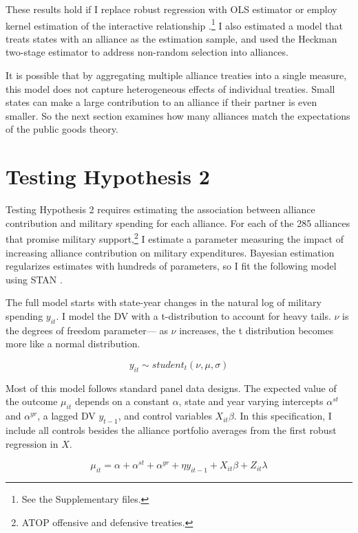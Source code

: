 \documentclass[12pt]{article}
\begin{document}
These results hold if I replace robust regression with OLS estimator or employ kernel estimation of the interactive relationship \citep{Hainmuelleretal2017}.\footnote{See the Supplementary files.} 
I also estimated a model that treats states with an alliance as the estimation sample, and used the Heckman two-stage estimator to address non-random selection into alliances. 


It is possible that by aggregating multiple alliance treaties into a single measure, this model does not capture heterogeneous effects of individual treaties.
Small states can make a large contribution to an alliance if their partner is even smaller. 
So the next section examines how many alliances match the expectations of the public goods theory. 


\section{Testing Hypothesis 2}


Testing Hypothesis 2 requires estimating the association between alliance contribution and military spending for each alliance.
For each of the 285 alliances that promise military support,\footnote{ATOP offensive and defensive treaties.} I estimate a parameter measuring the impact of increasing alliance contribution on military expenditures. 
Bayesian estimation regularizes estimates with hundreds of parameters, so I fit the following model using STAN \citep{Carpenteretal2016}.

The full model starts with state-year changes in the natural log of military spending $y_{it}$.
I model the DV with a t-distribution to account for heavy tails.
$\nu$ is the degrees of freedom parameter--- as $\nu$ increases, the t distribution becomes more like a normal distribution. 


\begin{equation}
y_{it} \sim student_t(\nu, \mu, \sigma) 
\end{equation}


Most of this model follows standard panel data designs.
The expected value of the outcome $\mu_{it}$ depends on a constant $\alpha$, state and year varying intercepts $\alpha^{st}$ and $\alpha^{yr}$, a lagged DV $y_{t-1}$, and control variables $X_{it} \beta$. 
In this specification, I include all controls besides the alliance portfolio averages from the first robust regression in $X$.


\begin{equation}
\mu_{it} = \alpha + \alpha^{st} + \alpha^{yr} + \eta y_{it-1} + X_{it} \beta + Z_{it} \lambda 
\end{equation}
\end{document}
